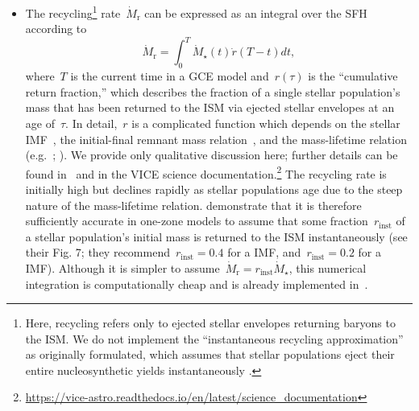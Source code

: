 \documentclass[ms.tex]{subfiles}
\begin{document}
\begin{itemize}
	\item The recycling\footnote{
		Here, recycling refers only to ejected stellar envelopes returning
		baryons to the ISM.
		We do not implement the ``instantaneous recycling approximation'' as
		originally formulated, which assumes that stellar populations eject
		their entire nucleosynthetic yields instantaneously
		\citep[see, e.g., the review in][]{Tinsley1980}.
	} rate~$\dot{M}_\text{r}$ can be expressed as an integral over the SFH
	according to
	\begin{equation}
	\dot{M}_\text{r} = \int_0^T \dot{M}_\star(t)\dot{r}(T - t)dt,
	\end{equation}
	where~$T$ is the current time in a GCE model and~$r(\tau)$ is the
	``cumulative return fraction,'' which describes the fraction of a single
	stellar population's mass that has been returned to the ISM via ejected
	stellar envelopes at an age of~$\tau$.
	In detail,~$r$ is a complicated function which depends on the stellar
	IMF~\citep[e.g.][]{Salpeter1955, Miller1979, Kroupa2001, Chabrier2003},
	the initial-final remnant mass relation~\citep[e.g.][]{Kalirai2008},
	and the mass-lifetime relation (e.g.~\citealp{Larson1974, Maeder1989};
	\citealp*{Hurley2000}).
	We provide only qualitative discussion here; further details can be found
	in~\citet{Weinberg2017} and in the VICE science documentation.\footnote{
		\url{https://vice-astro.readthedocs.io/en/latest/science_documentation}
	}
	The recycling rate is initially high but declines rapidly as stellar
	populations age due to the steep nature of the mass-lifetime relation.
	\citet{Weinberg2017} demonstrate that it is therefore sufficiently accurate
	in one-zone models to assume that some fraction~$r_\text{inst}$ of a
	stellar population's initial mass is returned to the ISM instantaneously
	(see their Fig. 7; they recommend~$r_\text{inst} = 0.4$ for a
	\citealt{Kroupa2001} IMF, and~$r_\text{inst} = 0.2$ for
	a~\citealt{Salpeter1955} IMF).
	Although it is simpler to assume~$\dot{M}_\text{r} =
	r_\text{inst}\dot{M}_\star$, this numerical integration is computationally
	cheap and is already implemented in~\vice.


\end{itemize}
\end{document}
